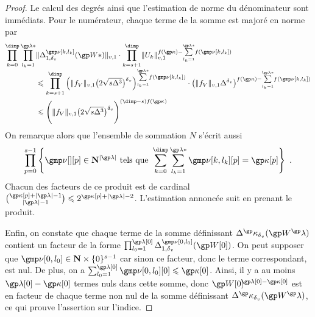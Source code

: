 \begin{proof}
  Le calcul des degrés ainsi que l'estimation de norme du dénominateur sont
  immédiats. Pour le numérateur, chaque terme de la somme est majoré en norme
  par
  \begin{align}
    \prod\indrange
    \prod_{ \indi_\ind = 1 }^{ \ip* }
    &
    \nv1{ \pmnum^\indl_{1, \dv}( \anyvp* ) }
    \cdot
    \prod_{\ind = \anydim + 1}^{\dimp}
    \nv1{ \pden_\ind }^{ f(\derp)
      - \smash{ \sum\limits_{\indi_\ind = 1}^{\ip*} } f(\indl) }
    \\ & \le
    \prod_{\ind = \anydim + 1}^{\dimp}
    \left(
      \nv1{ \chow\anyvar }
      \bigl( 2 \sqrt{\anydim \anydeg^{3}} \bigr)^\dv
    \right)^{ \smash{ \sum\limits_{\indi_\ind = 1}^{\ip*} } f(\indl) }
    \cdot \left(
      \nv1{ \chow\anyvar } \anydeg^\dv
    \right)^{ f(\derp)
      - \smash{ \sum\limits_{\indi_\ind = 1}^{\ip*} } f(\indl) }
    \\ & \le
    \Biggl(
    \nv1{ \chow\anyvar }
    \bigl( 2 \sqrt{\anydim \anydeg^{3}} \bigr)^\dv
    \Biggr)^{(\dimp - \anydim) f(\derp)}
  \end{align}
  On remarque alors que l'ensemble de sommation \( N \) s'écrit aussi
  \begin{equation}
    \prod_{p = 0}^{\anydim - 1} \left\{
      \gmp\nu[][p] \in \N^{\lgr\ip}
      \text{ tels que }
      \sum\indrange \sum_{\indi_\ind = 1}^{\ip*}
      \gmp\nu[\ind, \indi_\ind][p]
      = \derp[p]
    \right\}
    \pmm.
  \end{equation}
  Chacun des facteurs de ce produit est de cardinal
  \(
    \binom{ \derp[p] + \lgr\ip - 1 }{ \lgr\ip - 1 }
    \le
    2^{ \derp[p] + \lgr\ip - 2 }
  \).
  L'estimation annoncée suit en prenant le produit.

  Enfin, on constate que chaque terme de la somme définissant
  \( \pmnum^\derp_\dv ( \anyvp^\ip ) \) contient un facteur de la forme
  \(
    \prod_{\indi_0 = 1}^{\ip[0]}
    \pmnum_{1, \dv}^{\gmp\nu[0, \indi_0]}( \anyvp[0] )
  \). On peut supposer que \( \gmp\nu[0, \indi_0] \in \N \times
    \set{0}^{\anydim-1} \) car sinon ce facteur, donc le terme correspondant,
  est nul. De plus, on a \( \sum_{\indi_0 = 1}^{\ip[0]} \gmp\nu[0, \indi_0][0]
    \le \derp[0] \). Ainsi, il y a au moins \( \ip[0] - \derp[0] \) termes
  nuls dans cette somme, donc \( \anyvp[0]^{\!\!\ip[0] - \derp[0]} \) est en
  facteur de chaque terme non nul de la somme définissant \( \pmnum^\derp_\dv
    ( \anyvp^\ip ) \), ce qui prouve l'assertion sur l'indice.
\end{proof}

